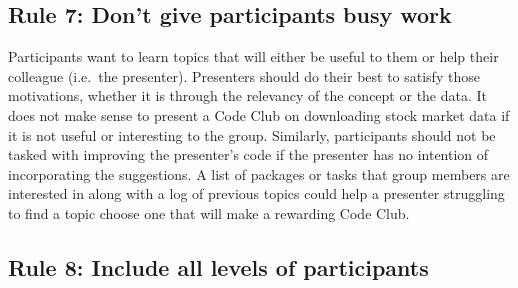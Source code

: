 \documentclass[
  11pt,
]{article}
\begin{document}
\hypertarget{rule-7-dont-give-participants-busy-work}{%
\subsection{Rule 7: Don't give participants busy
work}\label{rule-7-dont-give-participants-busy-work}}

Participants want to learn topics that will either be useful to them or
help their colleague (i.e.~the presenter). Presenters should do their
best to satisfy those motivations, whether it is through the relevancy
of the concept or the data. It does not make sense to present a Code
Club on downloading stock market data if it is not useful or interesting
to the group. Similarly, participants should not be tasked with
improving the presenter's code if the presenter has no intention of
incorporating the suggestions. A list of packages or tasks that group
members are interested in along with a log of previous topics could help
a presenter struggling to find a topic choose one that will make a
rewarding Code Club.

\hypertarget{rule-8-include-all-levels-of-participants}{%
\subsection{Rule 8: Include all levels of
participants}\label{rule-8-include-all-levels-of-participants}}
\end{document}
